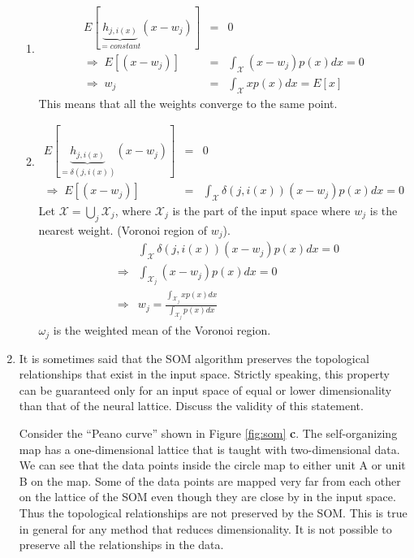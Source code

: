 \begin{enumerate}
  \begin{solution}

    \begin{enumerate}
    \item
      \begin{eqnarray*}
        E[\underbrace{h_{j,i(x)}}_{=constant}(x-w_j)]&=&0\\
        \Rightarrow\;E[(x-w_j)]&=&\int_\mathcal{X}(x-w_j)p(x)dx=0\\
        \Rightarrow\;w_j&=&\int_\mathcal{X}xp(x)dx=E[x]
      \end{eqnarray*}
      This means that all the weights converge to the same point.

    \item
      \begin{eqnarray*}
        E[\underbrace{h_{j,i(x)}}_{=\delta(j,i(x))}(x-w_j)]&=&0\\
        \Rightarrow\;E[(x-w_j)]&=&\int_\mathcal{X}\delta(j,i(x))(x-w_j)p(x)dx=0
      \end{eqnarray*}
      Let $\mathcal{X}=\bigcup_j\mathcal{X}_j$, where $\mathcal{X}_j$ is the part
      of the input space where $w_j$ is the nearest weight. (Voronoi region
      of $w_j$).
      \begin{eqnarray*}
        & &\int_\mathcal{X}\delta(j,i(x))(x-w_j)p(x)dx=0 \\
        &\Rightarrow&\int_{\mathcal{X}_j}(x-w_j)p(x)dx=0\\
        &\Rightarrow&w_j=\frac{\int_{\mathcal{X}_j}xp(x)dx}{\int_{\mathcal{X}_j}p(x)dx}
      \end{eqnarray*}
      $\omega_j$ is the weighted mean of the Voronoi region.
    \end{enumerate}
  \end{solution}

  
\item It is sometimes said that the SOM algorithm preserves the
  topological relationships that exist in the input space. Strictly
  speaking, this property can be guaranteed only for an input space of
  equal or lower dimensionality than that of the neural
  lattice. Discuss the validity of this statement.

  \begin{solution}


    Consider the ``Peano curve'' shown in Figure \ref{fig:som}{\bf
      c}. The self-organizing map has a one-dimensional lattice that is
    taught with two-dimensional data. We can see that the data points
    inside the circle map to either unit A or unit B on the map. Some of
    the data points are mapped very far from each other on the lattice of
    the SOM even though they are close by in the input space. Thus the
    topological relationships are not preserved by the SOM. This is true
    in general for any method that reduces dimensionality. It is
    not possible to preserve all the relationships in the data.


\end{solution}
\end{enumerate}
